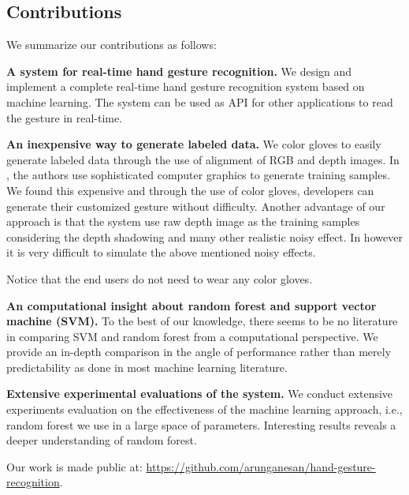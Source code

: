 \subsection{Contributions}

We summarize our contributions as follows:

\textbf{A system for real-time hand gesture recognition.} We design and implement a complete real-time hand gesture recognition system based on machine learning. The system can be used as API for other applications to read the gesture in real-time.

\textbf{An inexpensive way to generate labeled data.} We color gloves to easily generate labeled data through the use of alignment of RGB and depth images. In , the authors use sophisticated computer graphics to generate training samples. We found this expensive and through the use of color gloves, developers can generate their customized gesture without difficulty. Another advantage of our approach is that the system use raw depth image as the training samples considering the depth shadowing and many other realistic noisy effect. In  however it is very difficult to simulate the above mentioned noisy effects. 

 Notice that the end users do not need to wear any color gloves. 

\textbf{An computational insight about random forest and support vector machine (SVM).} To the best of our knowledge, there seems to be no literature in comparing  SVM and random forest from a computational perspective. We provide an in-depth comparison in the angle of performance rather than merely predictability as done in most machine learning literature. 

\textbf{Extensive experimental evaluations of the system.} We conduct extensive experiments evaluation on the effectiveness of the machine learning approach, i.e., random forest we use in a large space of parameters. Interesting results reveals a deeper understanding of random forest. 

Our work is made public at: \url{https://github.com/arunganesan/hand-gesture-recognition}.